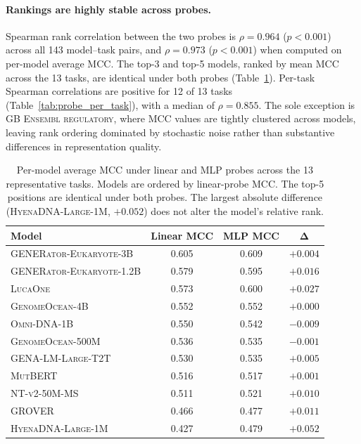 \documentclass{llmxive}
\begin{document}
\paragraph{Rankings are highly stable across probes.}
Spearman rank correlation between the two probes is $\rho = 0.964$
($p < 0.001$) across all 143 model--task pairs, and $\rho = 0.973$
($p < 0.001$) when computed on per-model average MCC. The top-3 and
top-5 models, ranked by mean MCC across the 13 tasks, are identical
under both probes (Table~\ref{tab:probe_rankings}). Per-task Spearman
correlations are positive for 12 of 13 tasks
(Table~\ref{tab:probe_per_task}), with a median of $\rho = 0.855$. The
sole exception is \textsc{GB Ensembl regulatory}, where MCC values
are tightly clustered across models, leaving rank ordering dominated by
stochastic noise rather than substantive differences in representation
quality.

\begin{table}[!htbp]
\centering
\small
\begin{tabular}{@{}lccc@{}}
\toprule
\textbf{Model} & \textbf{Linear MCC} & \textbf{MLP MCC} & $\boldsymbol{\Delta}$ \\
\midrule
\textsc{GENERator-Eukaryote-3B}    & 0.605 & 0.609 & $+0.004$ \\
\textsc{GENERator-Eukaryote-1.2B}  & 0.579 & 0.595 & $+0.016$ \\
\textsc{LucaOne}                    & 0.573 & 0.600 & $+0.027$ \\
\textsc{GenomeOcean-4B}            & 0.552 & 0.552 & $+0.000$ \\
\textsc{Omni-DNA-1B}                & 0.550 & 0.542 & $-0.009$ \\
\textsc{GenomeOcean-500M}          & 0.536 & 0.535 & $-0.001$ \\
\textsc{GENA-LM-Large-T2T}         & 0.530 & 0.535 & $+0.005$ \\
\textsc{MutBERT}                    & 0.516 & 0.517 & $+0.001$ \\
\textsc{NT-v2-50M-MS}              & 0.511 & 0.521 & $+0.010$ \\
\textsc{GROVER}                     & 0.466 & 0.477 & $+0.011$ \\
\textsc{HyenaDNA-Large-1M}         & 0.427 & 0.479 & $+0.052$ \\
\bottomrule
\end{tabular}
\caption{Per-model average MCC under linear and MLP probes across the 13
representative tasks. Models are ordered by linear-probe MCC. The top-5
positions are identical under both probes. The largest absolute
difference (\textsc{HyenaDNA-Large-1M}, $+0.052$) does not alter the
model's relative rank.}
\label{tab:probe_rankings}
\end{table}
\end{document}
